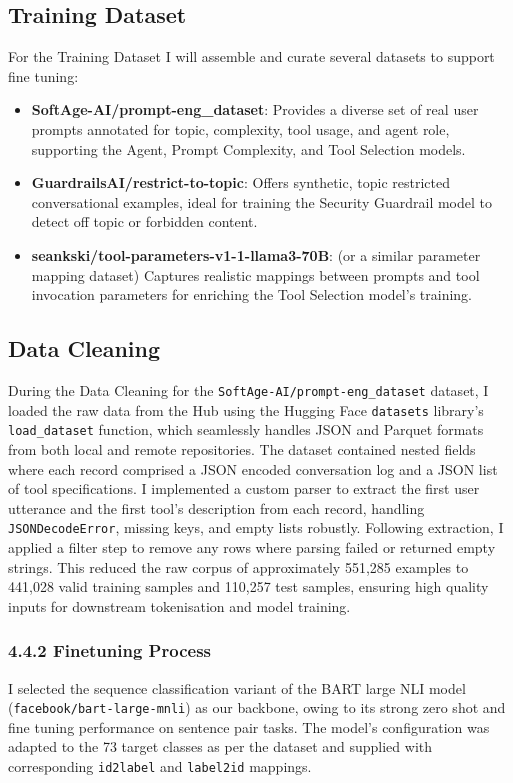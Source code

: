 \subsection{Training Dataset}
\label{training dataset}

For the Training Dataset I will assemble and curate several datasets to support fine tuning:
\begin{itemize}
    \item \textbf{SoftAge-AI/prompt-eng\_dataset}: Provides a diverse set of real user prompts annotated for topic, complexity, tool usage, and agent role, supporting the Agent, Prompt Complexity, and Tool Selection models.
    \item \textbf{GuardrailsAI/restrict-to-topic}: Offers synthetic, topic restricted conversational examples, ideal for training the Security Guardrail model to detect off topic or forbidden content.
    \item \textbf{seankski/tool-parameters-v1-1-llama3-70B}: (or a similar parameter mapping dataset) Captures realistic mappings between prompts and tool invocation parameters for enriching the Tool Selection model’s training.
\end{itemize}

\subsection{Data Cleaning}
During the Data Cleaning for the \texttt{SoftAge-AI/prompt-eng\_dataset} dataset, I loaded the raw data from the Hub using the Hugging Face \texttt{datasets} library’s \texttt{load\_dataset} function, which seamlessly handles JSON and Parquet formats from both local and remote repositories. The dataset contained nested fields where each record comprised a JSON encoded conversation log and a JSON list of tool specifications. I implemented a custom parser to extract the first user utterance and the first tool’s description from each record, handling \texttt{JSONDecodeError}, missing keys, and empty lists robustly. Following extraction, I applied a filter step to remove any rows where parsing failed or returned empty strings. This reduced the raw corpus of approximately 551,285 examples to 441,028 valid training samples and 110,257 test samples, ensuring high quality inputs for downstream tokenisation and model training.



\subsubsection{4.4.2 Finetuning Process}
I selected the sequence classification variant of the BART large NLI model (\texttt{facebook/bart-large-mnli}) as our backbone, owing to its strong zero shot and fine tuning performance on sentence pair tasks. The model’s configuration was adapted to the 73 target classes as per the dataset and supplied with corresponding \texttt{id2label} and \texttt{label2id} mappings.

